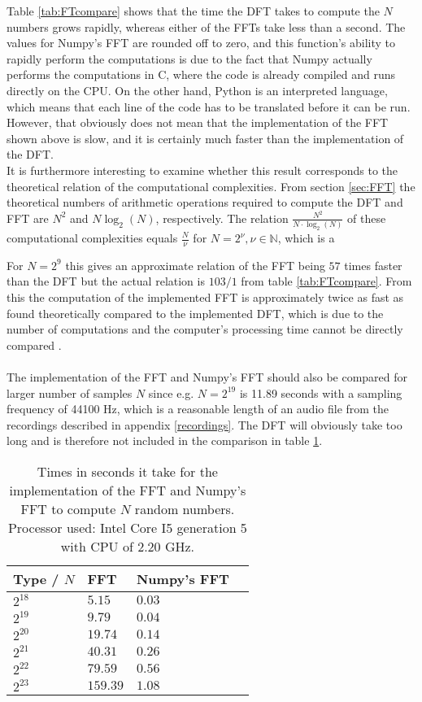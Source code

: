 Table \ref{tab:FTcompare} shows that the time the DFT takes to compute the $N$ numbers grows rapidly, whereas either of the FFTs take less than a second. The values for Numpy's FFT are rounded off to zero, and this function's ability to rapidly perform the computations is due to the fact that Numpy actually performs the computations in C, where the code is already compiled and runs directly on the CPU. On the other hand, Python is an interpreted language, which means that each line of the code has to be translated before it can be run. However, that obviously does not mean that the implementation of the FFT shown above is slow, and it is certainly much faster than the implementation of the DFT. \\
It is furthermore interesting to examine whether this result corresponds to the theoretical relation of the computational complexities. From section \ref{sec:FFT} the theoretical numbers of arithmetic operations required to compute the DFT and FFT are $N^2$ and $N\log_2(N)$, respectively. The relation $\frac{N^2}{N \cdot \log_2(N)}$ of these computational complexities equals $\frac{N}{\nu}$ for $N = 2^\nu, \nu \in \mathbb{N}$, which is a 


  
For $N=2^9$ this gives an approximate relation of the FFT being $57$ times faster than the DFT but the actual relation is $103/1$ from table \ref{tab:FTcompare}. From this the computation of the implemented FFT is approximately twice as fast as found theoretically compared to the implemented DFT, which is due to the number of computations and the computer's processing time cannot be directly compared . \\
\\
The implementation of the FFT and Numpy's FFT should also be compared for larger number of samples $N$ since e.g. $N = 2^{19}$ is 11.89 seconds with a sampling frequency of 44100 Hz, which is a reasonable length of an audio file from the recordings described in appendix \ref{recordings}. The DFT will obviously take too long and is therefore not included in the comparison in table \ref{tab:FT2compare}.

\begin{table}[H]
\centering
\begin{tabular}{|l|l|l|l|}
\hline
Type / $N$ & FFT	   & Numpy's FFT \\ \hline
$2^{18}$   & $5.15$    & $0.03$ \\ \hline
$2^{19}$   & $9.79$    & $0.04$ \\ \hline
$2^{20}$   & $19.74$   & $0.14$ \\ \hline
$2^{21}$   & $40.31$   & $0.26$ \\ \hline
$2^{22}$   & $79.59$   & $0.56$ \\ \hline
$2^{23}$   & $159.39$  & $1.08$ \\ \hline
\end{tabular}
\caption{Times in seconds it take for the implementation of the FFT and Numpy's FFT to compute $N$ random numbers. Processor used: Intel Core I5 generation 5 with CPU of 2.20 GHz.}
\label{tab:FT2compare}
\end{table}

